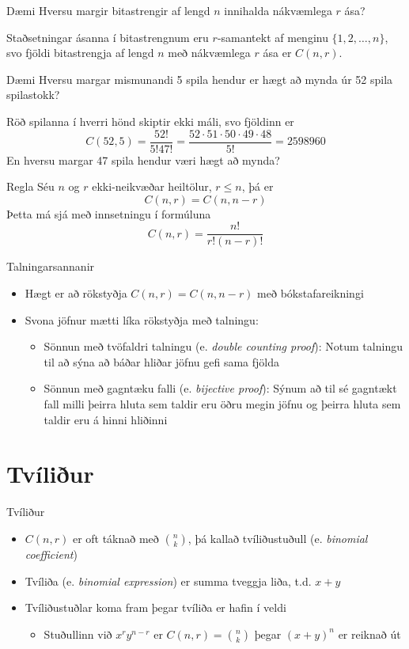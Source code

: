 \documentclass{beamer}
\begin{document}
\begin{frame}{Dæmi}
Hversu margir bitastrengir af lengd $n$ innihalda nákvæmlega $r$ ása? \pause

Staðsetningar ásanna í bitastrengnum eru $r$-samantekt af menginu $\{1,2,\ldots,n\}$, svo fjöldi bitastrengja af lengd $n$ með nákvæmlega $r$ ása er $C(n, r)$.
\end{frame}

\begin{frame}{Dæmi}
Hversu margar mismunandi 5 spila hendur er hægt að mynda úr 52 spila spilastokk? \pause

Röð spilanna í hverri hönd skiptir ekki máli, svo fjöldinn er
\[
 C(52,5) = \frac{52!}{5!47!} = \frac{52\cdot51\cdot50\cdot49\cdot48}{5!} = 2598960
\]
\pause
En hversu margar 47 spila hendur væri hægt að mynda?
\end{frame}

\begin{frame}{Regla}
Séu $n$ og $r$ ekki-neikvæðar heiltölur, $r \leq n$, þá er
\[
 C(n,r) = C(n,n-r)
\]
Þetta má sjá með innsetningu í formúluna 
\[
 C(n,r) = \frac{n!}{r!(n-r)!}
\]
\end{frame}

\begin{frame}{Talningarsannanir}
\begin{itemize}
 \item Hægt er að rökstyðja $C(n,r) = C(n,n-r)$ með bókstafareikningi
 \item Svona jöfnur mætti líka rökstyðja með talningu:
 \begin{itemize}
  \item Sönnun með tvöfaldri talningu (e. \emph{double counting proof}): Notum talningu til að sýna að báðar hliðar jöfnu gefi sama fjölda
  \item Sönnun með gagntæku falli (e. \emph{bijective proof}): Sýnum að til sé gagntækt fall milli þeirra hluta sem taldir eru öðru megin jöfnu og þeirra hluta sem taldir eru á hinni hliðinni
 \end{itemize}
\end{itemize}
\end{frame}

\section{Tvíliður}

\begin{frame}{Tvíliður}
\begin{itemize}
 \item $C(n,r)$ er oft táknað með $\binom{n}{k}$, þá kallað tvíliðustuðull (e. \emph{binomial coefficient})
 \item Tvíliða (e. \emph{binomial expression}) er summa tveggja liða, t.d. $x + y$
 \item Tvíliðustuðlar koma fram þegar tvíliða er hafin í veldi
 \begin{itemize}
  \item Stuðullinn við $x^ry^{n-r}$ er $C(n,r) = \binom{n}{k}$ þegar $(x + y)^n$ er reiknað út
 \end{itemize}
\end{itemize}
\end{frame}
\end{document}
